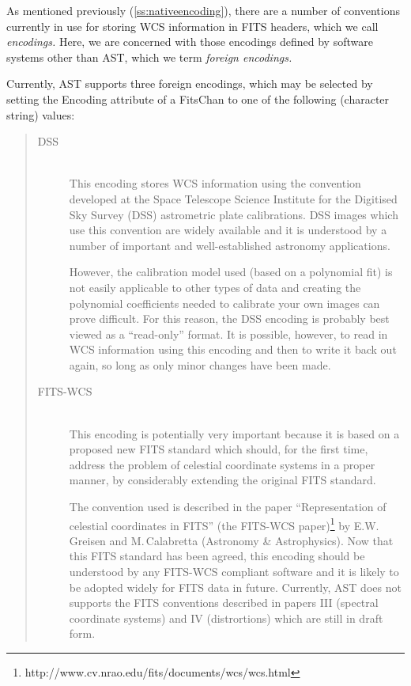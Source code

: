 \documentclass[twoside,11pt]{article}
\newcommand{\htmladdnormallinkfoot}[2]{#1\footnote{#2}}
\newcommand{\secref}[1]{\S\ref{#1}}
\renewcommand{\secref}[1]{\ref{#1}}
\begin{document}
As mentioned previously (\secref{ss:nativeencoding}), there are a
number of conventions currently in use for storing WCS information in
FITS headers, which we call {\em{encodings.}} Here, we are concerned
with those encodings defined by software systems other than AST, which
we term {\em{foreign encodings.}}

Currently, AST supports three foreign encodings, which may be selected
by setting the Encoding attribute of a FitsChan to one of the
following (character string) values:

\begin{quote}
\begin{description}
\item[DSS]\mbox{}\\
This encoding stores WCS information using the convention developed at
the Space Telescope Science Institute for the Digitised Sky Survey
(DSS) astrometric plate calibrations.  DSS images which use this
convention are widely available and it is understood by a number of
important and well-established astronomy applications.

However, the calibration model used (based on a polynomial fit) is not
easily applicable to other types of data and creating the polynomial
coefficients needed to calibrate your own images can prove
difficult. For this reason, the DSS encoding is probably best viewed
as a ``read-only'' format. It is possible, however, to read in WCS
information using this encoding and then to write it back out again,
so long as only minor changes have been made.

\item[FITS-WCS]\mbox{}\\
This encoding is potentially very important because it is based on a
proposed new FITS standard which should, for the first time, address
the problem of celestial coordinate systems in a proper manner, by
considerably extending the original FITS standard.

The convention used is described in the paper ``Representation
of celestial coordinates in FITS'' \htmladdnormallinkfoot{(the
FITS-WCS paper)}{http://www.cv.nrao.edu/fits/documents/wcs/wcs.html}
by E.W.\,Greisen and M.\,Calabretta (Astronomy \& Astrophysics). Now that
this FITS standard has been agreed, this encoding
should be understood by any FITS-WCS compliant software and it is
likely to be adopted widely for FITS data in future.  Currently, AST does
not supports the FITS conventions described in papers III (spectral coordinate
systems) and IV (distrortions) which are still in draft form.


\end{description}
\end{quote}
\end{document}
